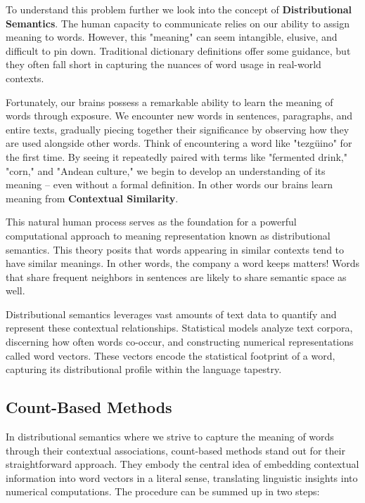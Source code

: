 \documentclass{report}
\begin{document}
To understand this problem further we look into the concept of \textbf{Distributional Semantics}. The human capacity to communicate relies on our ability to assign meaning to words. However, this "meaning" can seem intangible, elusive, and difficult to pin down. Traditional dictionary definitions offer some guidance, but they often fall short in capturing the nuances of word usage in real-world contexts.

Fortunately, our brains possess a remarkable ability to learn the meaning of words through exposure. We encounter new words in sentences, paragraphs, and entire texts, gradually piecing together their significance by observing how they are used alongside other words. Think of encountering a word like "tezgüino" for the first time. By seeing it repeatedly paired with terms like "fermented drink," "corn," and "Andean culture," we begin to develop an understanding of its meaning – even without a formal definition. In other words our brains learn meaning from \textbf{Contextual Similarity}.

This natural human process serves as the foundation for a powerful computational approach to meaning representation known as distributional semantics. This theory posits that words appearing in similar contexts tend to have similar meanings. In other words, the company a word keeps matters! Words that share frequent neighbors in sentences are likely to share semantic space as well.

Distributional semantics leverages vast amounts of text data to quantify and represent these contextual relationships. Statistical models analyze text corpora, discerning how often words co-occur, and constructing numerical representations called word vectors. These vectors encode the statistical footprint of a word, capturing its distributional profile within the language tapestry.

\subsection{Count-Based Methods}
In distributional semantics where we strive to capture the meaning of words through their contextual associations, count-based methods stand out for their straightforward approach. They embody the central idea of embedding contextual information into word vectors in a literal sense, translating linguistic insights into numerical computations. The procedure can be summed up in two steps:
\end{document}
